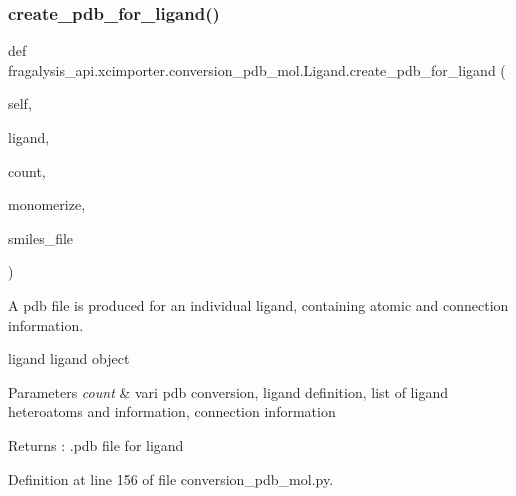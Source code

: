 \subsubsection{\texorpdfstring{create\+\_\+pdb\+\_\+for\+\_\+ligand()}{create\_pdb\_for\_ligand()}}
{\footnotesize\ttfamily def fragalysis\+\_\+api.\+xcimporter.\+conversion\+\_\+pdb\+\_\+mol.\+Ligand.\+create\+\_\+pdb\+\_\+for\+\_\+ligand (\begin{DoxyParamCaption}\item[{}]{self,  }\item[{}]{ligand,  }\item[{}]{count,  }\item[{}]{monomerize,  }\item[{}]{smiles\+\_\+file }\end{DoxyParamCaption})}



A pdb file is produced for an individual ligand, containing atomic and connection information. 

ligand ligand object 
\begin{DoxyParams}{Parameters}
{\em count} & vari pdb conversion, ligand definition, list of ligand heteroatoms and information, connection information \\
\hline
\end{DoxyParams}
\begin{DoxyReturn}{Returns}
\+: .pdb file for ligand 
\end{DoxyReturn}


Definition at line 156 of file conversion\+\_\+pdb\+\_\+mol.\+py.


